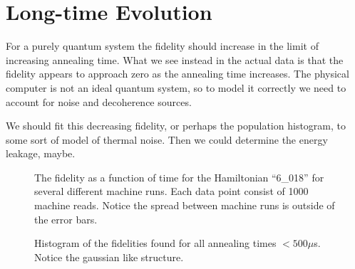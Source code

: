 \section{Long-time Evolution}
For a purely quantum system the fidelity should increase in the limit of increasing annealing time.  What we see instead in the actual data is that the fidelity appears to approach zero as the annealing time increases.  The physical computer is not an ideal quantum system, so to model it correctly we need to account for noise and decoherence sources.

We should fit this decreasing fidelity, or perhaps the population histogram, to some sort of model of thermal noise.  Then we could determine the energy leakage, maybe.


\begin{figure}
	\caption[Short Time Fidelities]{The fidelity as a function of time for the Hamiltonian ``6\_018'' for several different machine runs.  Each data point consist of 1000 machine reads.  Notice the spread between machine runs is outside of the error bars.}
	\label{fig:short_fidelity}
\end{figure}

\begin{figure}
	\caption[Short Time Fidelity Histogram]{Histogram of the fidelities found for all annealing times  $< 500 \mu$s.  Notice the gaussian like structure.}
	\label{fig:fid_hist}
\end{figure}

